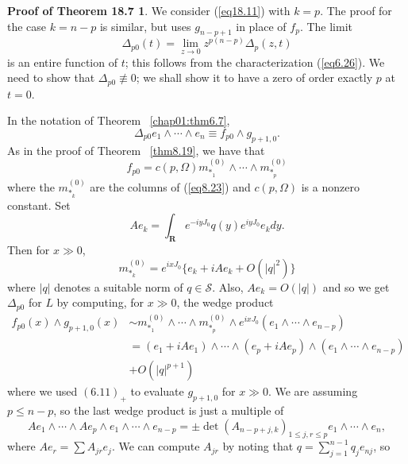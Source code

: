 \documentclass{surv-l}
\theoremstyle{plain}
\theoremstyle{definition}
\newtheorem*{pot}{\sc Proof of Theorem 18.7}
\numberwithin{equation}{chapter}
\begin{document}
\begin{pot}
We consider (\ref{eq18.11}) with $k=p$. The proof for the case $k=n-p$ is similar, but uses $g_{n-p+1}$ in place of $f_{p}$. The limit
\setcounter{equation}{13}
\begin{equation}\label{eq18.14}
\Delta_{p0}(t)=\lim_{z\rightarrow 0}z^{p(n-p)}\Delta_{p}(z,t)
\end{equation}
is an entire function of $t$; this follows from the characterization (\ref{eq6.26}). We need to show that $\Delta_{p0}\not\equiv 0$; we shall show it to have a zero of order exactly $p$ at $t=0$.

In the notation of Theorem ~\ref{chap01:thm6.7},
\begin{equation*}
\Delta_{p0}e_{1}\wedge\cdots\wedge e_{n}\equiv f_{p0}\wedge g_{p+1,0}.
\end{equation*}
As in the proof of Theorem ~\ref{thm8.19}, we have that
\begin{equation*}
f_{p0}=c(p,\Omega)m_{*_{1}}^{(0)}\wedge\cdots\wedge m_{*_{p}}^{(0)}
\end{equation*}
where the $m_{*_{k}}^{(0)}$ are the columns of (\ref{eq8.23}) and $c(p,\Omega)$ is a nonzero constant. Set
\begin{equation}\label{eq18.15}
Ae_{k}=\int_{\mathbf{R}}e^{-iyJ_{0}}q(y)e^{iyJ_{0}}e_{k}dy.
\end{equation}
Then for $x\gg 0$,
\begin{equation*}
m_{*_{k}}^{(0)}=e^{ixJ_{0}}\{e_{k}+iAe_{k}+O(|q|^{2})\}
\end{equation*}
where $|q|$ denotes a suitable norm of $q\in \mathscr{S}$. Also, $Ae_{k}=O(|q|)$ and so we get $\Delta_{p0}$ for $L$ by computing, for $x\gg 0$, the wedge product
\begin{align*}
f_{p0}(x)\wedge g_{p+1,0}(x)&\sim m_{*_{1}}^{(0)}\wedge\cdots\wedge m_{*_{p}}^{(0)}\wedge e^{ixJ_{0}}(e_{1}\wedge \cdots\wedge e_{n-p})\\
&=(e_{1}+iAe_{1})\wedge\cdots\wedge(e_{p}+iAe_{p})\wedge(e_{1}\wedge\cdots\wedge e_{n-p})\\
&+O(|q|^{p+1})
\end{align*}
where we used $(6.11)_{+}$ to evaluate $g_{p+1,0}$ for $x \gg 0$. We are assuming $p\leq n -p$, so the last wedge product is just a multiple of
\begin{equation*}
Ae_{1}\wedge\cdots\wedge Ae_{p}\wedge e_{1}\wedge\cdots\wedge e_{n-p}=\pm\det(A_{n-p+j,k})_{1\leq j,r\leq p}e_{1}\wedge \cdots\wedge e_{n},
\end{equation*}
where $Ae_{r}= \sum A_{j r}e_{j}$. We can compute $A_{j r}$ by noting that $q=\sum_{j=1}^{n-1}q_{j}e_{nj}$, so

\end{pot}
\end{document}
